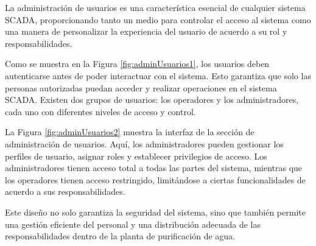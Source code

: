 La administración de usuarios es una característica esencial de cualquier sistema SCADA, proporcionando tanto un medio para controlar el acceso al sistema como una manera de personalizar la experiencia del usuario de acuerdo a su rol y responsabilidades.


Como se muestra en la Figura \ref{fig:adminUsuarios1}, los usuarios deben autenticarse antes de poder interactuar con el sistema. Esto garantiza que solo las personas autorizadas puedan acceder y realizar operaciones en el sistema SCADA. Existen dos grupos de usuarios: los operadores y los administradores, cada uno con diferentes niveles de acceso y control.


La Figura \ref{fig:adminUsuarios2} muestra la interfaz de la sección de administración de usuarios. Aquí, los administradores pueden gestionar los perfiles de usuario, asignar roles y establecer privilegios de acceso. Los administradores tienen acceso total a todas las partes del sistema, mientras que los operadores tienen acceso restringido, limitándose a ciertas funcionalidades de acuerdo a sus responsabilidades.

Este diseño no solo garantiza la seguridad del sistema, sino que también permite una gestión eficiente del personal y una distribución adecuada de las responsabilidades dentro de la planta de purificación de agua.






